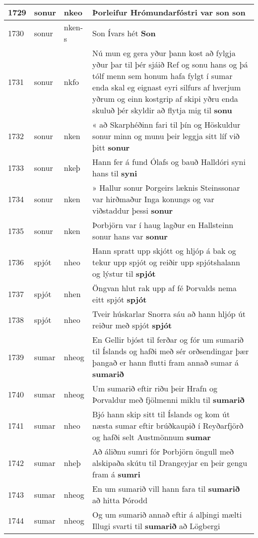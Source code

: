 \documentclass{article}
\begin{document}
\begin{longtable}{p{1cm}|p{1cm}|p{1cm}|p{13cm}}
\hline
1729&sonur&nkeo&Þorleifur Hrómundarfóstri var son \textbf{son} \\
\hline
1730&sonur&nken-s&Son Ívars hét \textbf{Son} \\
\hline
1731&sonur&nkfo&Nú mun eg gera yður þann kost að fylgja yður þar til þér sjáið Ref og sonu hans og þá tólf menn sem honum hafa fylgt í sumar enda skal eg eignast eyri silfurs af hverjum yðrum og einn kostgrip af skipi yðru enda skuluð þér skyldir að flytja mig til \textbf{sonu} \\
\hline
1732&sonur&nken&« að Skarphéðinn fari til þín og Höskuldur sonur minn og munu þeir leggja sitt líf við þitt \textbf{sonur} \\
\hline
1733&sonur&nkeþ&Hann fer á fund Ólafs og bauð Halldóri syni hans til \textbf{syni} \\
\hline
1734&sonur&nken&» Hallur sonur Þorgeirs læknis Steinssonar var hirðmaður Inga konungs og var viðstaddur þessi \textbf{sonur} \\
\hline
1735&sonur&nken&Þorbjörn var í haug lagður en Hallsteinn sonur hans var \textbf{sonur} \\
\hline
1736&spjót&nheo&Hann spratt upp skjótt og hljóp á bak og tekur upp spjót og reiðir upp spjótshalann og lýstur til \textbf{spjót} \\
\hline
1737&spjót&nhen&Öngvan hlut rak upp af fé Þorvalds nema eitt spjót \textbf{spjót} \\
\hline
1738&spjót&nheo&Tveir húskarlar Snorra sáu að hann hljóp út reiður með spjót \textbf{spjót} \\
\hline
1739&sumar&nheog&En Gellir bjóst til ferðar og fór um sumarið til Íslands og hafði með sér orðsendingar þær þangað er hann flutti fram annað sumar á \textbf{sumarið} \\
\hline
1740&sumar&nheog&Um sumarið eftir riðu þeir Hrafn og Þorvaldur með fjölmenni miklu til \textbf{sumarið} \\
\hline
1741&sumar&nheo&Bjó hann skip sitt til Íslands og kom út næsta sumar eftir brúðkaupið í Reyðarfjörð og hafði selt Austmönnum \textbf{sumar} \\
\hline
1742&sumar&nheþ&Að áliðnu sumri fór Þorbjörn öngull með alskipaða skútu til Drangeyjar en þeir gengu fram á \textbf{sumri} \\
\hline
1743&sumar&nheog&En um sumarið vill hann fara til \textbf{sumarið} að hitta Þórodd\\
\hline
1744&sumar&nheog&Og um sumarið annað eftir á alþingi mælti Illugi svarti til \textbf{sumarið} að Lögbergi\\

\end{longtable}
\end{document}
